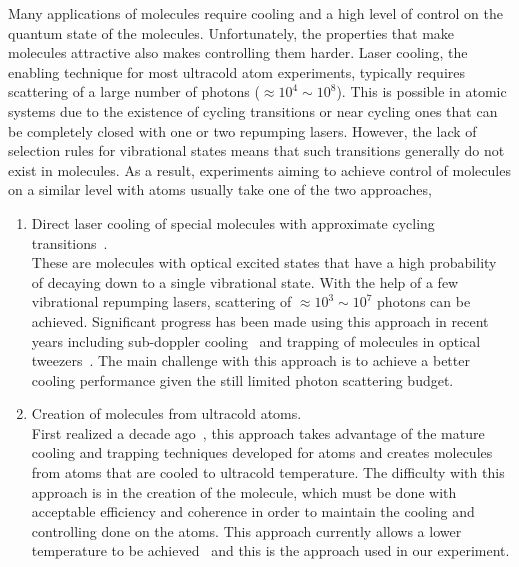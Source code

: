 Many applications of molecules require cooling and a high level of control
on the quantum state of the molecules.
Unfortunately, the properties that make molecules attractive
also makes controlling them harder.
Laser cooling, the enabling technique for most ultracold atom experiments,
typically requires scattering of a large number of photons ($\approx\!10^4\sim10^8$).
This is possible in atomic systems due to the existence of cycling transitions
or near cycling ones that can be completely closed with one or two repumping lasers.
However, the lack of selection rules for vibrational states means that
such transitions generally do not exist in molecules.
As a result, experiments aiming to achieve control of molecules on a similar level with atoms
usually take one of the two approaches,
\begin{enumerate}
\item Direct laser cooling of special molecules
  with approximate cycling transitions~\cite{barry_magneto-optical_2014,
    norrgard_submillikelvin_2016,truppe_molecules_2017,
    anderegg_laser_2018,mccarron_magnetic_2018,collopy_3d_2018,
    mitra_direct_2020,ding_sub-doppler_2020}.\\
  These are molecules with optical excited states that have a high probability
  of decaying down to a single vibrational state.
  With the help of a few vibrational repumping lasers,
  scattering of $\approx\!10^3\sim10^7$ photons can be achieved.
  Significant progress has been made using this approach in recent years
  including sub-doppler cooling~\cite{cheuk_mathrmlambda-enhanced_2018}
  and trapping of molecules in optical tweezers~\cite{anderegg_optical_2019}.
  The main challenge with this approach is to achieve a better cooling performance
  given the still limited photon scattering budget.
\item Creation of molecules from ultracold atoms.\\
  First realized a decade ago~\cite{ni_high_2008,lang_ultracold_2008},
  this approach takes advantage of the mature cooling and trapping techniques
  developed for atoms and creates molecules from atoms
  that are cooled to ultracold temperature.
  The difficulty with this approach is in the creation of the molecule,
  which must be done with acceptable efficiency and coherence
  in order to maintain the cooling and controlling done on the atoms.
  This approach currently allows a lower temperature to be achieved~\cite{
    marco_degenerate_2019,zhang_forming_2020,he_coherently_2020}
  and this is the approach used in our experiment.
\end{enumerate}


